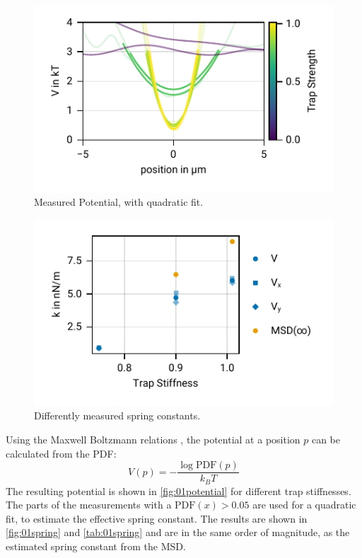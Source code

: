 \documentclass[
    twoside=false,
    twocolumn=true,
    fontsize=11pt,
]{scrarticle}
\begin{document}
\begin{figure}
    \centering
    \includegraphics{figures/01_03_3_axis.pdf}
    \caption{Measured Potential, with quadratic fit.}
    \label{fig:01potential}
\end{figure}
\begin{figure}
    \centering
    \includegraphics{figures/01_03_4_spring_constants.pdf}
    \caption{Differently measured spring constants.}
    \label{fig:01spring}
\end{figure}
Using the Maxwell Boltzmann relations \cite{instructions}, the potential at a position $p$ can be calculated from the PDF:
\begin{equation}
    V(p) = - \frac{\log{\text{PDF}(p)}}{k_B T}
    \label{eq:pot_boltzmann}
\end{equation}
The resulting potential is shown in \autoref{fig:01potential} for different trap stiffnesses.
The parts of the measurements with a $\text{PDF}(x)>0.05$ are used for a quadratic fit, to estimate the effective spring constant.
The results are shown in \autoref{fig:01spring} and \autoref{tab:01spring} and are in the same order of magnitude, as the estimated spring constant from the MSD.
\end{document}
